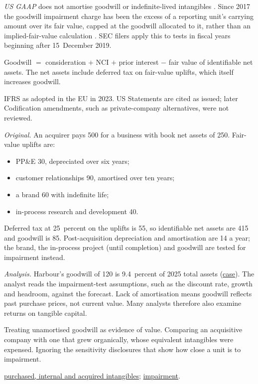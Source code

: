 \begin{qfmethod}
\emph{US GAAP} does not amortise goodwill or indefinite-lived intangibles \citep[paras.~16--18]{us-goodwill-intangibles-2001}. Since 2017 the goodwill impairment charge has been the excess of a reporting unit's carrying amount over its fair value, capped at the goodwill allocated to it, rather than an implied-fair-value calculation \citep[pp.~2--3]{us-goodwill-2017}. SEC filers apply this to tests in fiscal years beginning after 15~December 2019.

 Goodwill $=$ consideration $+$ NCI $+$ prior interest $-$ fair value of identifiable net assets. The net assets include deferred tax on fair-value uplifts, which itself increases goodwill.

 IFRS as adopted in the EU in 2023. US Statements are cited as issued; later Codification amendments, such as private-company alternatives, were not reviewed.

 \emph{Original.} An acquirer pays 500 for a business with book net assets of 250. Fair-value uplifts are:
\begin{itemize}
\item PP\&E 30, depreciated over six years;
\item customer relationships 90, amortised over ten years;
\item a brand 60 with indefinite life;
\item in-process research and development 40.
\end{itemize}
Deferred tax at 25~percent on the uplifts is 55, so identifiable net assets are 415 and goodwill is 85. Post-acquisition depreciation and amortisation are 14 a year; the brand, the in-process project (until completion) and goodwill are tested for impairment instead.

\emph{Analysis.} Harbour's goodwill of 120 is 9.4~percent of 2025 total assets (\hyperref[ex:harbour-tools-statements]{case}). The analyst reads the impairment-test assumptions, such as the discount rate, growth and headroom, against the forecast. Lack of amortisation means goodwill reflects past purchase prices, not current value. Many analysts therefore also examine returns on tangible capital.

 Treating unamortised goodwill as evidence of value. Comparing an acquisitive company with one that grew organically, whose equivalent intangibles were expensed. Ignoring the sensitivity disclosures that show how close a unit is to impairment.

 \hyperref[meth:intangible-acquisition-routes]{purchased, internal and acquired intangibles}; \hyperref[meth:impairment-derecognition]{impairment}.

\end{qfmethod}

